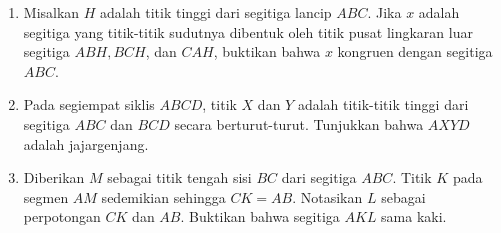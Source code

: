 \documentclass[12pt]{article}
\begin{document}
\begin{enumerate}
	\item
	Misalkan $H$ adalah titik tinggi dari segitiga lancip $ABC$. Jika $x$ adalah segitiga yang titik-titik sudutnya dibentuk oleh titik pusat lingkaran luar segitiga $ABH,BCH$, dan $CAH$, buktikan bahwa $x$ kongruen dengan segitiga $ABC$.
	
	\item
	Pada segiempat siklis $ABCD$, titik $X$ dan $Y$ adalah titik-titik tinggi dari segitiga $ABC$ dan $BCD$ secara berturut-turut. Tunjukkan bahwa $AXYD$ adalah jajargenjang.
	
	\item
	Diberikan $M$ sebagai titik tengah sisi $BC$ dari segitiga $ABC$. Titik $K$ pada segmen $AM$ sedemikian sehingga $CK=AB$. Notasikan $L$ sebagai perpotongan $CK$ dan $AB$. Buktikan bahwa segitiga $AKL$ sama kaki.
\end{enumerate}
\end{document}
